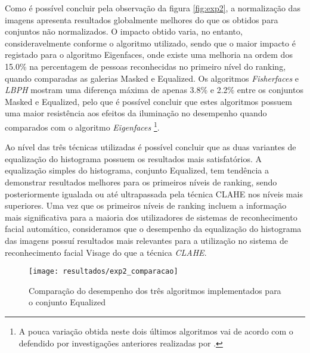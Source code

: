 Como é possível concluir pela observação da figura \ref{fig:exp2}, a normalização das imagens apresenta resultados globalmente melhores do que os obtidos para conjuntos não normalizados. O impacto obtido varia, no entanto, consideravelmente conforme o algoritmo utilizado, sendo que o maior impacto é registado para o algoritmo Eigenfaces, onde existe uma melhoria na ordem dos 15.0\% na percentagem de pessoas reconhecidas no primeiro nível do ranking, quando comparadas as galerias Masked e Equalized. Os algoritmos \textit{Fisherfaces} e \textit{LBPH} mostram uma diferença máxima de apenas 3.8\% e 2.2\% entre os conjuntos Masked e Equalized, pelo que é possível concluir que estes algoritmos possuem uma maior resistência aos efeitos da iluminação no desempenho quando comparados com o algoritmo \textit{Eigenfaces} \footnote{A pouca variação obtida neste dois últimos algoritmos vai de acordo com o defendido por investigações anteriores realizadas por \cite{ahonen2004face}.}.

Ao nível das três técnicas utilizadas é possível concluir que as duas variantes de equalização do histograma possuem os resultados mais satisfatórios. A equalização simples do histograma, conjunto Equalized, tem tendência a demonstrar resultados melhores para os primeiros níveis de ranking, sendo posteriormente igualada ou até ultrapassada pela técnica CLAHE nos níveis mais superiores. Uma vez que os primeiros níveis de ranking incluem a informação mais significativa para a maioria dos utilizadores de sistemas de reconhecimento facial automático, consideramos que o desempenho da equalização do histograma das imagens possuí resultados mais relevantes para a utilização no sistema de reconhecimento facial Visage do que a técnica \textit{CLAHE}.

\begin{figure}[ht]
  \begin{center}
    \leavevmode
    \texttt{[image: resultados/exp2\_comparacao]}
    \caption{Comparação do desempenho dos três algoritmos implementados para o conjunto Equalized}
    \label{fig:exp2_comaparacao}
  \end{center}
\end{figure}

